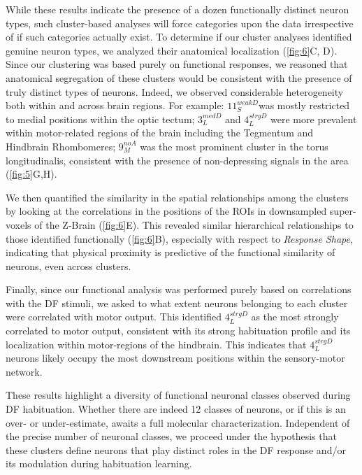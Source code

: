 \documentclass[9pt,lineno]{RandlettLab_elife}
\begin{document}
\vspace{5mm}
While these results indicate the presence of a dozen functionally distinct neuron types, such cluster-based analyses will force categories upon the data irrespective of if such categories actually exist. To determine if our cluster analyses identified genuine neuron types, we analyzed their anatomical localization (\autoref{fig:6}C, D). Since our clustering was based purely on functional responses, we reasoned that anatomical segregation of these clusters would be consistent with the presence of truly distinct types of neurons. Indeed, we observed considerable heterogeneity both within and across brain regions. For example: 
$11_{S}^{weakD}$was mostly restricted to medial positions within the optic tectum; 
$3_{L}^{medD}$ and $4_{L}^{strgD}$ were more prevalent within motor-related regions of the brain including the Tegmentum and Hindbrain Rhombomeres; 
$9_{M}^{noA}$ was the most prominent cluster in the torus longitudinalis, consistent with the presence of non-depressing signals in the area (\autoref{fig:5}G,H). 

We then quantified the similarity in the spatial relationships among the clusters by looking at the correlations in the positions of the ROIs in downsampled super-voxels of the Z-Brain (\autoref{fig:6}E). This revealed similar hierarchical relationships to those identified functionally (\autoref{fig:6}B), especially with respect to \emph{Response Shape}, indicating that physical proximity is predictive of the functional similarity of neurons, even across clusters. 

Finally, since our functional analysis was performed purely based on correlations with the DF stimuli, we asked to what extent neurons belonging to each cluster were correlated with motor output. This identified $4_{L}^{strgD}$ as the most strongly correlated to motor output, consistent with its strong habituation profile and its localization within motor-regions of the hindbrain. This indicates that $4_{L}^{strgD}$ neurons likely occupy the most downstream positions within the sensory-motor network. 

These results highlight a diversity of functional neuronal classes observed during DF habituation. Whether there are indeed 12 classes of neurons, or if this is an over- or under-estimate, awaits a full molecular characterization. Independent of the precise number of neuronal classes, we proceed under the hypothesis that these clusters define neurons that play distinct roles in the DF response and/or its modulation during habituation learning. 
\pagebreak
\end{document}
